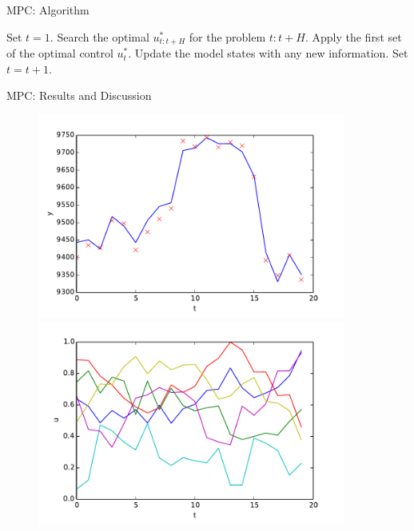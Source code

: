 \documentclass[handout]{beamer}
\begin{document}
\begin{frame}{MPC: Algorithm}
  \begin{algorithmic}[1]
  \State Set $t = 1$.
  \State Search the optimal $u^*_{t:t+H}$ for the problem $t:t+H$.
  \State Apply the first set of the optimal control  $u^*_{t}$.
  \State Update the model states with any new information.
  \State Set $t = t + 1$.
  \EndWhile
  \EndFunction
  \end{algorithmic}
\end{frame}

\begin{frame}{MPC: Results and Discussion}

   \begin{figure}
    \centering
    \includegraphics[width = 0.9\textwidth, height=0.4\textheight]{figure/DAXMPC-y-2.pdf}\\
    \includegraphics[width = 0.9\textwidth, height=0.4\textheight]{figure/DAXMPC-u-2.pdf}
  \end{figure}
\end{frame}
\end{document}
